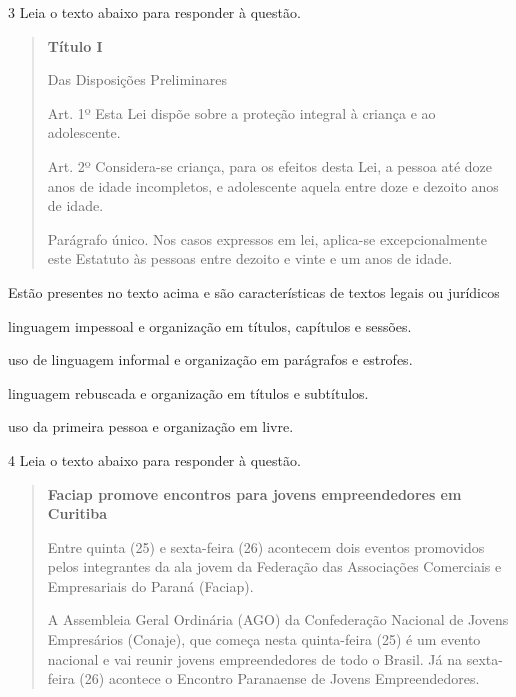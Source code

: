 \num{3} Leia o texto abaixo para responder à questão. 

\begin{quote}

\textbf{Título I}

Das Disposições Preliminares

Art. 1º Esta Lei dispõe sobre a proteção integral à criança e ao
adolescente.

Art. 2º Considera-se criança, para os efeitos desta Lei, a pessoa até
doze anos de idade incompletos, e adolescente aquela entre doze e
dezoito anos de idade.

Parágrafo único. Nos casos expressos em lei, aplica-se excepcionalmente
este Estatuto às pessoas entre dezoito e vinte e um anos de idade.

\end{quote}


Estão presentes no texto acima e são características de textos legais ou
jurídicos

\begin{escolha}

\item linguagem impessoal e organização em títulos, capítulos e sessões.
\item uso de linguagem informal e organização em parágrafos e estrofes.
\item linguagem rebuscada e organização em títulos e subtítulos.
\item uso da primeira pessoa e organização em livre.
\end{escolha}

\num{4} Leia o texto abaixo para responder à questão. 

\begin{quote}

\textbf{Faciap promove encontros para jovens empreendedores em Curitiba}

Entre quinta (25) e sexta-feira (26) acontecem dois eventos promovidos
pelos integrantes da ala jovem da Federação das Associações Comerciais e
Empresariais do Paraná (Faciap).

A Assembleia Geral Ordinária (AGO) da Confederação Nacional de Jovens
Empresários (Conaje), que começa nesta quinta-feira (25) é um evento
nacional e vai reunir jovens empreendedores de todo o Brasil. Já na
sexta-feira (26) acontece o Encontro Paranaense de Jovens
Empreendedores.

\end{quote}

